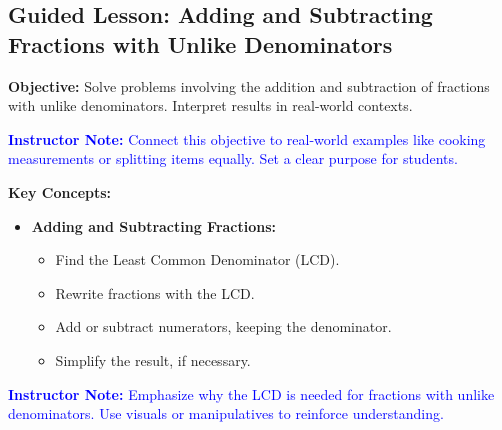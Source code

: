 \documentclass[12pt]{article}
\title{}
\date{}
\begin{document}
\subsection*{Guided Lesson: Adding and Subtracting Fractions with Unlike Denominators}
\onehalfspacing

\begin{tcolorbox}[colframe=black!40, colback=gray!5, 
coltitle=black, colbacktitle=black!20, fonttitle=\bfseries\Large, 
title=Learning Objective, halign title=center, left=5pt, right=5pt, top=5pt, bottom=15pt]
\textbf{Objective:} Solve problems involving the addition and subtraction of fractions with unlike denominators. Interpret results in real-world contexts.

\textcolor{blue}{\textbf{Instructor Note:} Connect this objective to real-world examples like cooking measurements or splitting items equally. Set a clear purpose for students.}
\end{tcolorbox}

\vspace{1em}

\begin{tcolorbox}[colframe=black!60, colback=white, 
coltitle=black, colbacktitle=black!15, fonttitle=\bfseries\Large, 
title=Key Concepts and Vocabulary, halign title=center, left=10pt, right=10pt, top=10pt, bottom=15pt]
\textbf{Key Concepts:}
\begin{itemize}
    \item \textbf{Adding and Subtracting Fractions:}
    \begin{itemize}
        \item Find the Least Common Denominator (LCD).
        \item Rewrite fractions with the LCD.
        \item Add or subtract numerators, keeping the denominator.
        \item Simplify the result, if necessary.
    \end{itemize}
\end{itemize}

\textcolor{blue}{\textbf{Instructor Note:} Emphasize why the LCD is needed for fractions with unlike denominators. Use visuals or manipulatives to reinforce understanding.}
\end{tcolorbox}

\vspace{1em}
\end{document}
